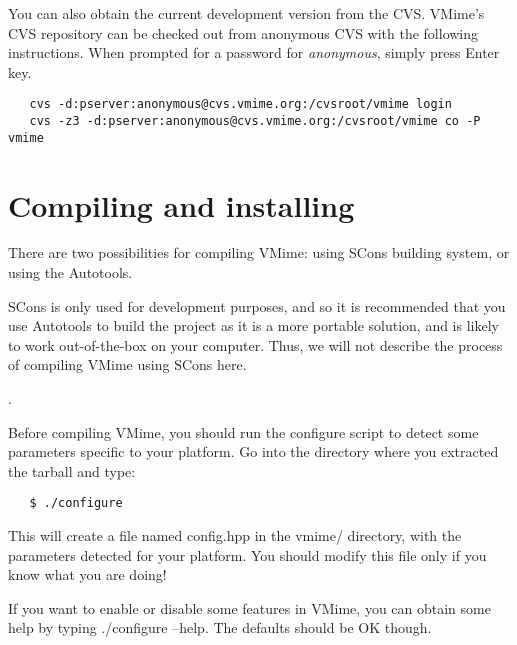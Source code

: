 You can also obtain the current development version from the CVS. VMime's CVS
repository can be checked out from anonymous CVS with the following
instructions. When prompted for a password for {\em anonymous}, simply press
Enter key.

\begin{verbatim}
   cvs -d:pserver:anonymous@cvs.vmime.org:/cvsroot/vmime login
   cvs -z3 -d:pserver:anonymous@cvs.vmime.org:/cvsroot/vmime co -P vmime
\end{verbatim}

\section{Compiling and installing}

There are two possibilities for compiling VMime: using SCons building system,
or using the Autotools.


SCons is only used for development purposes, and so it is recommended that you
use Autotools to build the project as it is a more portable solution, and is
likely to work out-of-the-box on your computer. Thus, we will not describe
the process of compiling VMime using SCons here.

.

Before compiling VMime, you should run the {\vcode configure} script to
detect some parameters specific to your platform. Go into the directory where
you extracted the tarball and type:

\begin{verbatim}
   $ ./configure
\end{verbatim}

This will create a file named {\vcode config.hpp} in the {\vcode vmime/}
directory, with the parameters detected for your platform. You should modify
this file only if you know what you are doing!

If you want to enable or disable some features in VMime, you can obtain some
help by typing {\vcode ./configure --help}. The defaults should be OK though.

